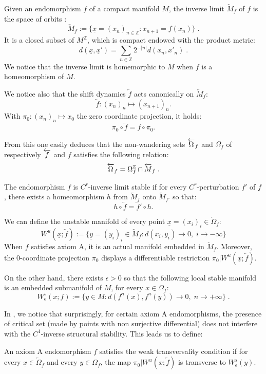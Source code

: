 \documentclass[11pt,openany,leqno]{article}
\begin{document}
Given an endomorphism $f$ of a compact manifold $M$, the inverse limit $\overleftarrow M_f$ of $f$ is the space of orbits :
\[\overleftarrow M_f:= \big\{\underline x= (x_n)_{n\in \mathbb Z} \colon x_{n+1} = f(x_n)\big\}\;.\]
It is a closed subset of $M^\mathbb Z$, which is compact endowed with the product metric:
\[d(\underline x,\underline x')= \sum_{n\in \mathbb Z} 2^{-|n|} d(x_n,x'_n)\;.\]
We notice that the inverse limit is homemorphic to $M$ when $f$ is a homeomorphism of $M$. 

We notice also that the shift dynamics $\overleftarrow f$ acts canonically on $\overleftarrow M_f$:
$$\overleftarrow f\colon (x_n)_n \mapsto (x_{n+1})_{n}. $$
With $\pi_0\colon (x_n)_n \mapsto x_0$ the zero coordinate projection, it holds:
$$\pi_0 \circ \overleftarrow f = f\circ \pi_0.$$

From this one easily deduces that the non-wandering sets  $\overleftarrow \Omega_{f}$ and $\Omega_{f}$ of respectively $\overleftarrow f$ and $f$ satisfies the following relation:
\[ \overleftarrow \Omega_{f} = \Omega_{f}^\mathbb Z\cap \overleftarrow M_f\; .\]

\begin{defi}
The endomorphism $f$ is $C^r$-inverse limit stable if for every $C^r$-perturbation $f'$ of $f$, there exists a homeomorphism $h$ from $\overleftarrow M_f$ onto $\overleftarrow M_{f'}$ so that:
\[h\circ \overleftarrow f = \overleftarrow f'\circ h.\]
\end{defi}

We can define the unstable manifold of every point $\underline x=(x_i)_i\in \overleftarrow \Omega_f$:
\[W^u(\underline x; \overleftarrow f):=\{\underline y=(y_i)_i\in \overleftarrow M_f\colon d(x_i,y_i)\to 0,\; i\to -\infty\}\]
When $f$ satisfies axiom A, it is an actual manifold embedded in $\overleftarrow M_f$. Moreover, the $0$-coordinate projection $\pi_0$ displays a differentiable restriction $\pi_0| W^u(\underline x; \overleftarrow f)$.

On the other hand, there exists $\epsilon>0$ so that the following local stable manifold is an embedded submanifold of $M$, for every  $x\in \Omega_f$:
  \[W^s_\epsilon( x;  f):=\{y\in M\colon d(f^n(x),f^n(y))\to 0,\; n\to +\infty\}\; .\]

In \cite{BR13}, we notice that surprisingly, for certain axiom A endomorphisms, the presence of critical set (made by points with non surjective differential) does not interfere with the $C^1$-inverse structural stability.  This leads us to define:
\begin{defi} An axiom A endomorphism $f$ satisfies the weak transversality condition if for every $\underline x\in \overleftarrow \Omega_f$ and every $y\in \Omega_f$, the map 
$\pi_0|W^u(\underline x; \overleftarrow f)$ is transverse to  $W^s_\epsilon(y)$.\end{defi}
\end{document}
